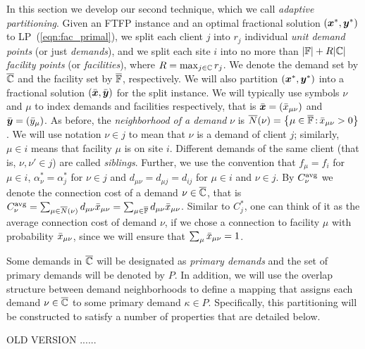 \documentclass[11pt]{article}
\begin{document}
In this section we develop our second technique, which we
call \emph{adaptive partitioning}. Given an FTFP instance and
an optimal fractional solution $(\boldsymbol{x}^\ast, \boldsymbol{y}^\ast)$ to
LP~(\ref{eqn:fac_primal}), we split each client $j$ into
$r_j$ individual \emph{unit demand points} (or just
\emph{demands}), and we split each site $i$ into no more
than $|\mathbb{F}|+R|\mathbb{C}|$ \emph{facility points} (or
\emph{facilities}), where $R=\max_{j\in\mathbb{C}}r_j$. We
denote the demand set by $\overline{\mathbb{C}}$ and the facility set
by $\overline{\mathbb{F}}$, respectively.  We will also partition
$(\boldsymbol{x}^\ast,\boldsymbol{y}^\ast)$ into a fractional solution
$(\bar{\boldsymbol{x}},\bar{\boldsymbol{y}})$ for the split instance.  We will
typically use symbols $\nu$ and $\mu$ to index demands and
facilities respectively, that is $\bar{\boldsymbol{x}} =
({\bar x}_{\mu\nu})$ and $\bar{\boldsymbol{y}} = ({\bar y}_{\mu})$.  
As before, the \emph{neighborhood of a demand} $\nu$ is
${\overline{N}}(\nu)={ \left\{ \mu\in\overline{\mathbb{F}} {\,:\,} {\bar x}_{\mu\nu}>0 \right\} }$.
We will use notation $\nu\in j$ to mean that $\nu$ is a demand of
client $j$; similarly, $\mu\in i$ means that facility $\mu$
is on site $i$. Different demands of the same client (that
is, $\nu,\nu'\in j$) are called \emph{siblings}.  Further,
we use the convention that $f_\mu = f_i$ for $\mu\in i$,
$\alpha_\nu^\ast = \alpha_j^\ast$ for $\nu\in j$ and
$d_{\mu\nu} = d_{\mu j} = d_{ij}$ for $\mu\in i$ and $\nu\in
j$.  By $C^{{\mbox{\scriptsize\rm avg}}}_{\nu}$ we denote the connection
cost of a demand $\nu\in\overline{\mathbb{C}}$, that is $C^{{\mbox{\scriptsize\rm avg}}}_{\nu}
=\sum_{\mu\in{\overline{N}}(\nu)}d_{\mu\nu}{\bar x}_{\mu\nu} =
\sum_{\mu\in\overline{\mathbb{F}}}d_{\mu\nu}{\bar x}_{\mu\nu}$.
Similar to $C^\ast_j$, one can think of it as the average connection
cost of demand $\nu$, if we chose a connection to facility $\mu$ with probability
${\bar x}_{\mu\nu}$, since we will ensure that $\sum_{\mu} {\bar x}_{\mu\nu}=1$.

Some demands in $\overline{\mathbb{C}}$ will be designated as
\emph{primary demands} and the set of primary demands will
be denoted by $P$. In addition, we will use the overlap
structure between demand neighborhoods to define a mapping
that assigns each demand $\nu\in\overline{\mathbb{C}}$ to some primary demand $\kappa\in P$.
Specifically, this partitioning will be constructed to
satisfy a number of properties that are detailed below.
%

OLD VERSION ......
\end{document}
